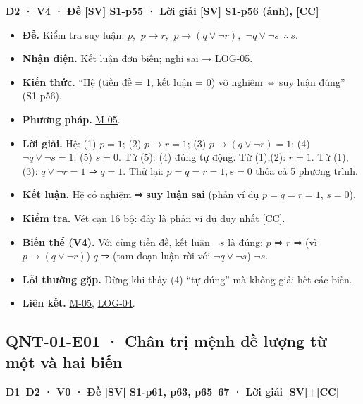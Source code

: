 \documentclass[
  10pt,
  twoside,openany]{book}
\providecommand{\tightlist}{%
  \setlength{\itemsep}{0pt}\setlength{\parskip}{0pt}}
\begin{document}
\textbf{D2 · V4 · Đề {[}SV{]} S1-p55 · Lời giải {[}SV{]} S1-p56 (ảnh),
{[}CC{]}}

\begin{itemize}
\tightlist
\item
  \textbf{Đề.} Kiểm tra suy luận: \(p\), \(\ p\to r\),
  \(\ p\to(q\vee\neg r)\), \(\ \neg q\vee\neg s\ \ \therefore\ s\).
\item
  \textbf{Nhận diện.} Kết luận đơn biến; nghi sai →
  \protect\hyperlink{LOG-05}{LOG-05}.
\item
  \textbf{Kiến thức.} ``Hệ (tiền đề = 1, kết luận = 0) vô nghiệm ⇔ suy
  luận đúng'' (S1-p56).
\item
  \textbf{Phương pháp.} \protect\hyperlink{M-05}{M-05}.
\item
  \textbf{Lời giải.} Hệ: (1) \(p=1\); (2) \(p\to r=1\); (3)
  \(p\to(q\vee\neg r)=1\); (4) \(\neg q\vee\neg s=1\); (5) \(s=0\). Từ
  (5): (4) đúng tự động. Từ (1),(2): \(r=1\). Từ (1),(3):
  \(q\vee\neg r=1\) ⇒ \(q=1\). Thử lại: \(p=q=r=1,s=0\) thỏa cả 5 phương
  trình.
\item
  \textbf{Kết luận.} Hệ có nghiệm ⇒ \textbf{suy luận sai} (phản ví dụ
  \(p=q=r=1\), \(s=0\)).
\item
  \textbf{Kiểm tra.} Vét cạn 16 bộ: đây là phản ví dụ duy nhất {[}CC{]}.
\item
  \textbf{Biến thể (V4).} Với cùng tiền đề, kết luận \textbf{\(\neg s\)}
  là đúng: \(p\) ⇒ \(r\) ⇒ (vì \(p\to(q\vee\neg r)\)) \(q\) ⇒ (tam đoạn
  luận rời với \(\neg q\vee\neg s\)) \(\neg s\).
\item
  \textbf{Lỗi thường gặp.} Dừng khi thấy (4) ``tự đúng'' mà không giải
  hết các biến.
\item
  \textbf{Liên kết.} \protect\hyperlink{M-05}{M-05},
  \protect\hyperlink{LOG-04}{LOG-04}.
\end{itemize}

\hypertarget{QNT-01-E01}{%
\subsection{QNT-01-E01 · Chân trị mệnh đề lượng từ một và hai
biến}\label{QNT-01-E01}}

\textbf{D1--D2 · V0 · Đề {[}SV{]} S1-p61, p63, p65--67 · Lời giải
{[}SV{]}+{[}CC{]}}
\end{document}
